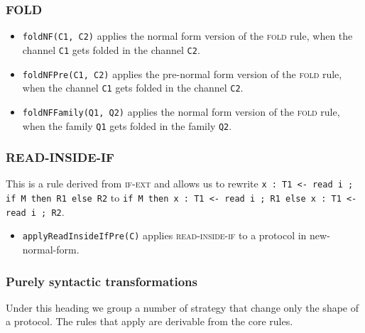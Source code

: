 \subsubsection{FOLD}

\begin{itemize}
\item \texttt{foldNF(C1, C2)} applies the normal form version of the 
\textsc{fold} rule, when the channel \texttt{C1} gets folded in the 
channel \texttt{C2}.
\item \texttt{foldNFPre(C1, C2)} applies the pre-normal form version of the 
\textsc{fold} rule, when the channel \texttt{C1} gets folded in the 
channel \texttt{C2}.
\item \texttt{foldNFFamily(Q1, Q2)} applies the normal form version 
of the 
\textsc{fold} rule, when the family \texttt{Q1} gets folded in the 
family \texttt{Q2}.
\end{itemize}

\subsubsection{READ-INSIDE-IF}

This is a rule derived from \textsc{if-ext} and allows us to rewrite
\texttt{x : T1 <- read i ; if M then R1 else R2} to 
\texttt{if M then x : T1 <- read i ; R1 else x : T1 <- read i ; R2}.

\begin{itemize}
\item \texttt{applyReadInsideIfPre(C)} applies 
\textsc{read-inside-if} to a protocol in new-normal-form.
\end{itemize}

\subsubsection{Purely syntactic transformations}

Under this heading we group a number of strategy that change
only the shape of a protocol. The rules that apply are
derivable from the core rules.

